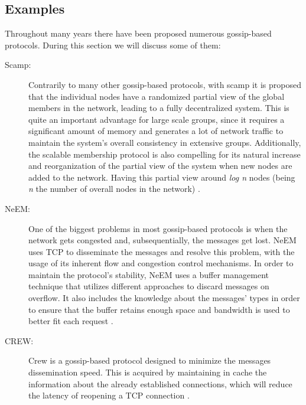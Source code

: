 \subsection{Examples}
\label{subsec:gossip_examples}
Throughout many years there have been proposed numerous gossip-based protocols. During this
section we will discuss some of them:
\begin{description}
    \item[\Gls{Scamp}:] Contrarily to many other gossip-based protocols, with scamp it is
        proposed that the individual nodes have a randomized partial view of the global
        members in the network, leading to a fully decentralized system. This is quite an
        important advantage for large scale groups, since it requires a significant amount
        of memory and generates a lot of network traffic to maintain the system's overall
        consistency in extensive groups. Additionally, the scalable membership protocol is
        also compelling for its natural increase and reorganization of the partial view of
        the system when new nodes are added to the network. Having this partial view around
        \textit{log n} nodes (being \textit{n} the number of overall nodes in the network)
        \cite{Ganesh2001}.
    \item[\Gls{NeEM}:] One of the biggest problems in most gossip-based protocols is when the
        network gets congested and, subsequentially, the messages get lost. NeEM uses \Gls{TCP}
        to disseminate the messages and resolve this problem, with the usage of its inherent
        flow and congestion control mechanisms. In order to maintain the protocol's stability,
        NeEM uses a buffer management technique that utilizes different approaches to discard
        messages on overflow. It also includes the knowledge about the messages' types in order
        to ensure that the buffer retains enough space and bandwidth is used to better fit each
        request \cite{Pereira2003}.
    \item[\Gls{CREW}:] Crew is a gossip-based protocol designed to minimize the messages
        dissemination speed. This is acquired by maintaining in cache the information about
        the already established connections, which will reduce the latency of reopening a
        TCP connection \cite{Deshpande2006}.
\end{description}


